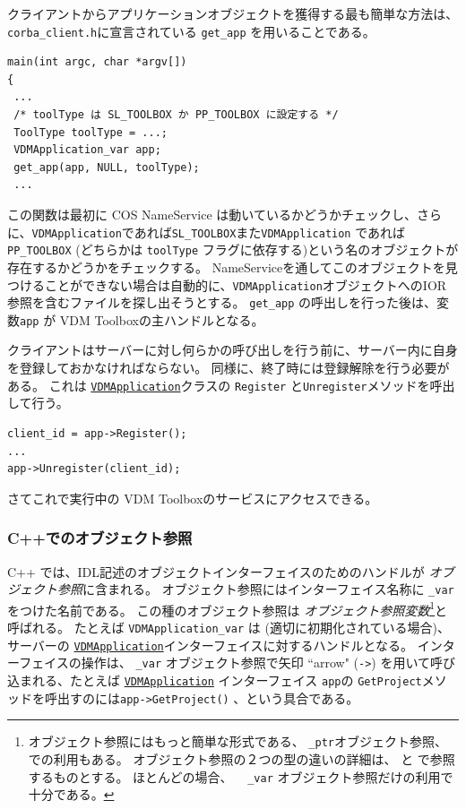 \documentclass[\pformat,12pt]{jarticle}
\newcommand{\VDMApplication}{\hyperlink{interface.VDMApplication}{VDMApplication}}
\begin{document}
クライアントからアプリケーションオブジェクトを獲得する最も簡単な方法は、{\tt corba\_client.h}に宣言されている {\tt get\_app} を用いることである。

\begin{verbatim}
main(int argc, char *argv[])
{
 ...
 /* toolType は SL_TOOLBOX か PP_TOOLBOX に設定する */
 ToolType toolType = ...;
 VDMApplication_var app;
 get_app(app, NULL, toolType);
 ...
\end{verbatim}

この関数は最初に COS NameService は動いているかどうかチェックし、さらに、{\tt VDMApplication}であれば{\tt SL\_TOOLBOX}また{\tt VDMApplication} であれば{\tt PP\_TOOLBOX} (どちらかは {\tt toolType} フラグに依存する)という名のオブジェクトが存在するかどうかをチェックする。
 NameServiceを通してこのオブジェクトを見つけることができない場合は自動的に、{\tt VDMApplication}オブジェクトへのIOR参照を含むファイルを探し出そうとする。
 {\tt get\_app} の呼出しを行った後は、変数{\tt app} が VDM Toolboxの主ハンドルとなる。

クライアントはサーバーに対し何らかの呼び出しを行う前に、サーバー内に自身を登録しておかなければならない。
同様に、終了時には登録解除を行う必要がある。
これは {\tt \VDMApplication}クラスの {\tt Register} と{\tt Unregister}メソッドを呼出して行う。

\begin{verbatim}
client_id = app->Register();
...
app->Unregister(client_id);
\end{verbatim}

さてこれで実行中の VDM Toolboxのサービスにアクセスできる。


\subsubsection{C++でのオブジェクト参照}
\label{objectreferences}

C++ では、IDL記述のオブジェクトインターフェイスのためのハンドルが {\em オブジェクト参照}に含まれる。
オブジェクト参照にはインターフェイス名称に {\tt \_var} をつけた名前である。
この種のオブジェクト参照は {\em オブジェクト参照変数}\footnote{オブジェクト参照にはもっと簡単な形式である、 {\tt \_ptr}オブジェクト参照、での利用もある。
オブジェクト参照の２つの型の違いの詳細は、 \cite{omniORB3} と \cite{OMG&96} で参照するものとする。
ほとんどの場合、 {\tt　\_var} オブジェクト参照だけの利用で十分である。}と呼ばれる。
たとえば {\tt VDMApplication\_var} は (適切に初期化されている場合)、 サーバーの {\tt \VDMApplication}インターフェイスに対するハンドルとなる。
インターフェイスの操作は、 {\tt \_var} オブジェクト参照で矢印 ``arrow" ({\tt ->}) を用いて呼び込まれる、たとえば {\tt \VDMApplication} インターフェイス {\tt app}の {\tt GetProject}メソッドを呼出すのには{\tt app->GetProject()} 、という具合である。
\end{document}
